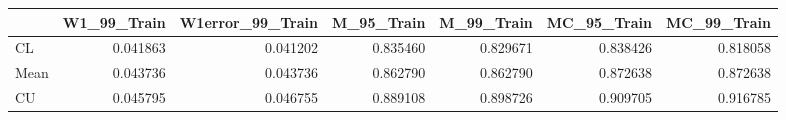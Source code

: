 \begin{tabular}{lrrrrrr}
\toprule
{} &  W1\_99\_Train &  W1error\_99\_Train &  M\_95\_Train &  M\_99\_Train &  MC\_95\_Train &  MC\_99\_Train \\
\midrule
CL   &     0.041863 &          0.041202 &    0.835460 &    0.829671 &     0.838426 &     0.818058 \\
Mean &     0.043736 &          0.043736 &    0.862790 &    0.862790 &     0.872638 &     0.872638 \\
CU   &     0.045795 &          0.046755 &    0.889108 &    0.898726 &     0.909705 &     0.916785 \\
\bottomrule
\end{tabular}
